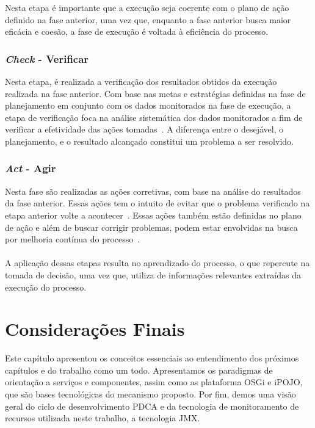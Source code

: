 Nesta etapa é importante que a execução seja coerente com o plano de ação definido na fase anterior, uma vez que, enquanto a fase anterior busca maior eficácia e coesão, a fase de execução é voltada à eficiência do processo.

\subsubsection{\textit{Check} - Verificar}
Nesta etapa, é realizada a verificação dos resultados obtidos da execução realizada na fase anterior. Com base nas metas e estratégias definidas na fase de planejamento em conjunto com os dados monitorados na fase de execução, a etapa de verificação foca na análise sistemática dos dados monitorados a fim de verificar a efetividade das ações tomadas~\cite{pdcacont}. A diferença entre o desejável, o planejamento, e o resultado alcançado constitui um problema a ser resolvido.

\subsubsection{\textit{Act} - Agir}
Nesta fase são realizadas as ações corretivas, com base na análise do resultados da fase anterior. Essas ações tem o intuito de evitar que o problema verificado na etapa anterior volte a acontecer~\cite{pdcacont}. Essas ações também estão definidas no plano de ação e além de buscar corrigir problemas, podem estar envolvidas na busca por melhoria contínua do processo~\cite{pdcaknow}.

\paragraph{}
A aplicação dessas etapas resulta no aprendizado do processo, o que repercute na tomada de decisão, uma vez que, utiliza de informações relevantes extraídas da execução do processo.

\section{Considerações Finais}
Este capítulo apresentou os conceitos essenciais ao entendimento dos próximos capítulos e do trabalho como um todo. Apresentamos os paradigmas de orientação a serviços e componentes, assim como as plataforma OSGi e iPOJO, que são bases tecnológicas do mecanismo proposto. Por fim, demos uma visão geral do ciclo de desenvolvimento PDCA e da tecnologia de monitoramento de recursos utilizada neste trabalho, a tecnologia JMX.